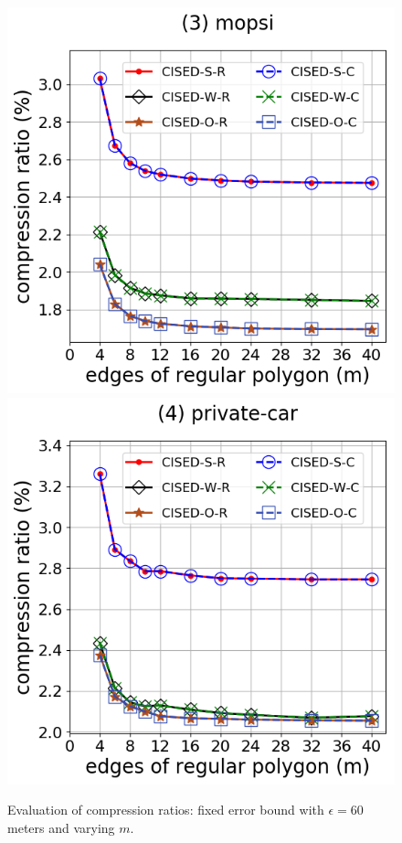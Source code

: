 \begin{figure}[tb!]
\includegraphics[scale = 0.3]{Figures/Exp-M-e-60-CR-mopsi.png}
\includegraphics[scale = 0.3]{Figures/Exp-M-e-60-CR-private.png}
\caption{\small Evaluation of compression ratios: fixed error bound with $\epsilon=60$ meters and varying $m$.}
\label{fig:m-cr-e60}
\end{figure}


